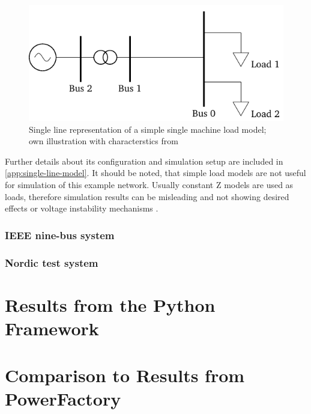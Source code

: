 \begin{figure}[htb!]
    \centering
    \includegraphics{tikz_graphics/images/sm_load_model.pdf}
    \caption{Single line representation of a simple single machine load model; own illustration with characterstics from \quelle}
    \label{fig:single-line-voltage-stability}
\end{figure}

Further details about its configuration and simulation setup are included in \autoref{app:single-line-model}. It should be noted, that simple load models are not useful for simulation of this example network. Usually constant Z models are used as loads, therefore simulation results can be misleading and not showing desired effects or voltage instability mechanisms \quelle. 

\subsubsection{IEEE nine-bus system}

\subsubsection{Nordic test system}

\section{Results from the Python Framework}

\section{Comparison to Results from PowerFactory}

